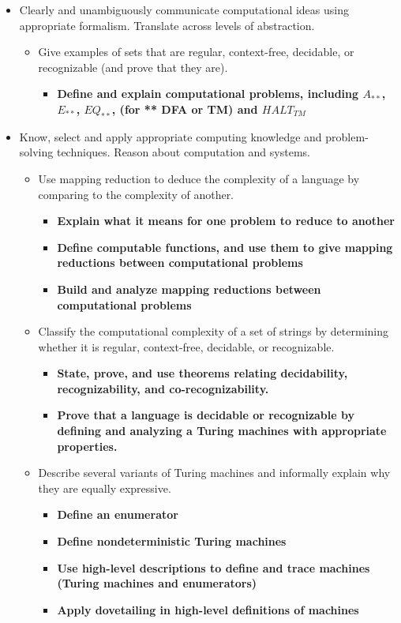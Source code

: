 \begin{itemize}
    \item Clearly and unambiguously communicate computational ideas using appropriate formalism. Translate across levels of abstraction.
    \begin{itemize}
        \item Give examples of sets that are regular, context-free, decidable, or recognizable (and prove that they are).
        \begin{itemize}
          \item {\bf Define and explain computational problems, including $A_{**}$, $E_{**}$, $EQ_{**}$, (for **  DFA or TM) and $HALT_{TM}$}
       \end{itemize}
    \end{itemize}
    \item Know, select and apply appropriate computing knowledge and problem-solving techniques. Reason about computation and systems.
    \begin{itemize}
        \item Use mapping reduction to deduce the complexity of a language by comparing to the complexity of another.
           \begin{itemize}
              \item {\bf Explain what it means for one problem to reduce to another}
              \item {\bf Define computable functions, and use them to give mapping reductions between computational problems}
              \item {\bf Build and analyze mapping reductions between computational problems}
           \end{itemize}
    \item Classify the computational complexity of a set of strings by determining whether it is regular, context-free, decidable, or recognizable.
    \begin{itemize}
         \item {\bf State, prove, and use theorems relating decidability, recognizability, and co-recognizability.}
         \item {\bf Prove that a language is decidable or recognizable by defining and analyzing a Turing machines with appropriate properties.}

   \end{itemize}
   \item  Describe several variants of Turing machines and informally explain why they are equally expressive.
   \begin{itemize}
   \item {\bf Define an enumerator}
   \item {\bf Define nondeterministic Turing machines}
   \item {\bf Use high-level descriptions to define and trace machines (Turing machines and enumerators)}
   \item {\bf Apply dovetailing in high-level definitions of machines}
   \end{itemize}
\end{itemize}
\end{itemize}

